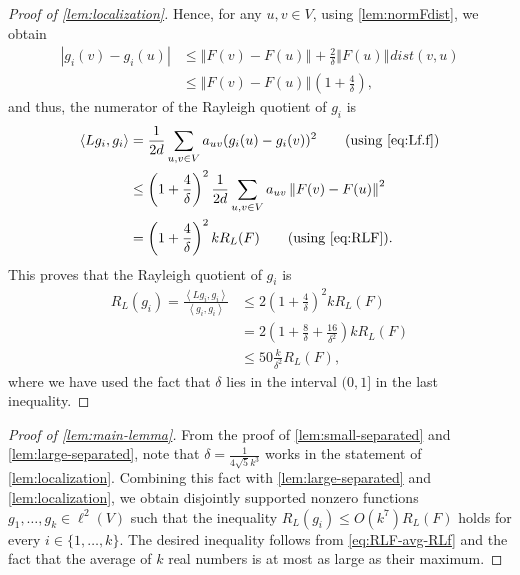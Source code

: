 \documentclass[12pt,a4paper,bold]{thesis}
\theoremstyle{definition}
\newcommand*{\abs}[1]{\left\vert #1 \right\vert}
\newcommand*{\ip}[2]{\left\langle #1 , #2 \right\rangle}
\newcommand*{\norm}[2][]{\left\Vert #2 \right\Vert_{#1}}
\begin{document}
\begin{proof}[Proof of \cref{lem:localization}]
    Hence, for any $u,v \in V$, using \cref{lem:normFdist}, we obtain
    \begin{align*}
        \abs{g_i(v) - g_i(u)} 
		& \leq 
		\norm{F(v) - F(u)} + \frac{2}{\delta} \norm{F(u)} dist(v,u)
		\\
        & \leq 
		\norm{F(v) - F(u)} \left(1 + \frac{4}{\delta}\right),
    \end{align*}
    and thus, the numerator of the Rayleigh quotient of $g_i$ is
    \begin{align*}
        \ip{Lg_i}{g_i} 
        & = 
        \frac{1}{2d} \sum_{u,v \in V} a_{uv} (g_i(u) - g_i(v))^2 \tag{using \cref{eq:Lf.f}}
        \\
        & \leq
        \left(1 + \frac{4}{\delta}\right)^2 \frac{1}{2d} \sum_{u,v \in V} a_{uv} \norm{F(v) - F(u)}^2
        \\
        & =
        \left(1 + \frac{4}{\delta}\right)^2 k R_L(F) \tag{using \cref{eq:RLF}}.
    \end{align*} 
    This proves that the Rayleigh quotient of $g_i$ is
    \begin{align*}
        R_L(g_i) = \frac{\ip{Lg_i}{g_i}}{\ip{g_i}{g_i}} 
        & \leq 
		2 \left(1 + \frac{4}{\delta}\right)^2 k R_L(F)
		\\
        & = 
		2 \left(1 + \frac{8}{\delta} + \frac{16}{\delta^2}\right) k R_L(F)
		\\
        & \leq 
		50 \frac{k}{\delta^2} R_L(F),
    \end{align*}
    where we have used the fact that $\delta$ lies in the interval $(0,1]$ 
    in the last inequality.
\end{proof}

\begin{proof}[Proof of \cref{lem:main-lemma}]
	From the proof of \cref{lem:small-separated} and \cref{lem:large-separated}, note that 
	$\delta = \frac{1}{4 \sqrt{5} k^3}$ works in the statement of \cref{lem:localization}.
    Combining this fact with \cref{lem:large-separated} and \cref{lem:localization}, 
    we obtain disjointly supported nonzero functions $g_1, \dots, g_k \in \ell^2(V)$ 
    such that the inequality $R_L(g_i) \leq O(k^7) R_L(F)$ holds for every 
    $i \in \{1, \dots, k\}$. The desired inequality follows from \cref{eq:RLF-avg-RLf}
    and the fact that the average of $k$ real numbers is at most as large as their maximum.
\end{proof}
\end{document}
